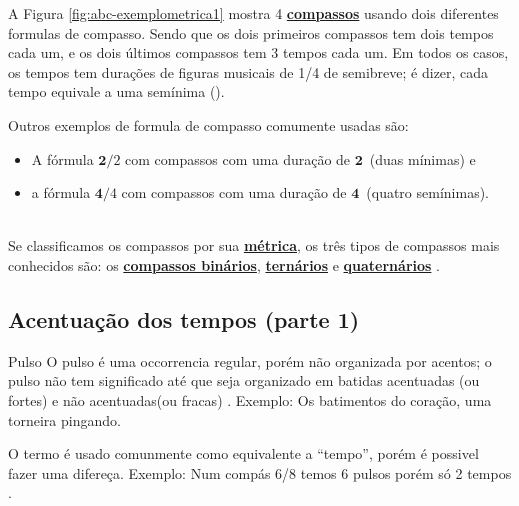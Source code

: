 \begin{description}
\begin{example}
\end{example}
\begin{example}
A Figura \ref{fig:abc-exemplometrica1} mostra 4 \hyperref[def:Compasso]{\textbf{compassos}} usando dois diferentes formulas de compasso.
Sendo que os dois primeiros compassos tem dois tempos cada um, 
e os dois últimos compassos tem 3 tempos cada um.
Em todos os casos, os tempos tem durações de figuras musicais de 1/4 de semibreve;
é dizer, cada tempo equivale a uma semínima (\Vier). 
\end{example}
\begin{example}
Outros exemplos de formula de compasso comumente usadas são:
\begin{itemize}
\item A fórmula $\mathbf{2}/2$ com compassos com uma duração de $\mathbf{2}$\halfnote ~(duas mínimas) e
\item a fórmula $\mathbf{4}/4$ com compassos com uma duração de $\mathbf{4}$\quarternote ~(quatro semínimas). 
\end{itemize}
\end{example}
\end{description}~\\


Se classificamos os compassos por sua \hyperref[def:Metrica]{\textbf{métrica}}, 
os três tipos de compassos mais conhecidos são: 
os \hyperref[subsec:compassobinario]{\textbf{compassos binários}}, 
\hyperref[subsec:compassoternario]{\textbf{ternários}} e 
\hyperref[subsec:compassoquaternario]{\textbf{quaternários}} \cite[pp. 27]{adolfo2002musica}.



\subsection{Acentuação dos tempos (parte 1)}
\label{subsec:acentuacion1}



\begin{tcbinformation}{Pulso}
\label{ref:Pulso}
O pulso é uma occorrencia regular, porém não organizada por acentos;
o pulso não tem significado até que seja organizado em batidas acentuadas (ou fortes) 
e não acentuadas(ou fracas) \cite[pp. 22]{holland2013music}. 
Exemplo: Os batimentos do coração, uma torneira pingando.

O termo é usado comunmente como equivalente a ``tempo'',
porém é possivel fazer uma difereça.
Exemplo: Num compás 6/8 temos 6 pulsos porém só 2 tempos \cite[pp. 1228]{latham2008diccionario}.
\end{tcbinformation} 

